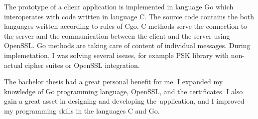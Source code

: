 \documentclass[
  12pt, 
  digital, %
  notable,   %
  nolof,     %
  nolot,     %
]{fithesis3}
\begin{document}
The prototype of a client application is implemented in language Go which interoperates with code 
written in language C. The source code contains the both languages written according to rules of 
Cgo. C methods serve the connection to the server and the communication between the client and 
the server using OpenSSL. Go methods are taking care of content of individual messages. During implemetation, I was solving several issues, for example PSK library with non-actual cipher suites or OpenSSL integration.

The bachelor thesis had a great personal benefit for me. I expanded my knowledge of Go 
programming language, OpenSSL, and the certificates. I also gain a great asset in designing and 
developing the~application, and I improved my programming skills in the languages C and Go. 

\printbibliography
\end{document}
